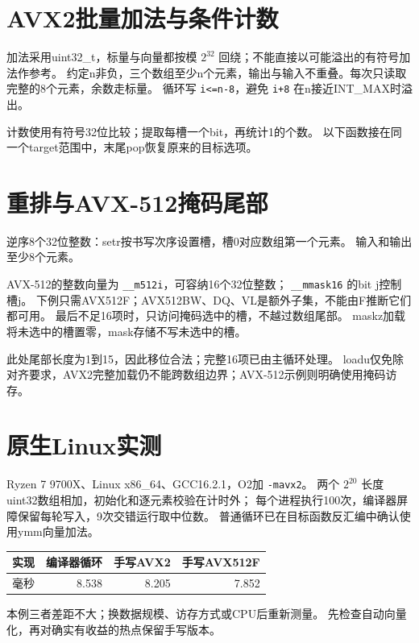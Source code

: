 \newpage
\section{AVX2批量加法与条件计数}
加法采用uint32\_t，标量与向量都按模 $2^{32}$ 回绕；不能直接以可能溢出的有符号加法作参考。
约定n非负，三个数组至少n个元素，输出与输入不重叠。每次只读取完整的8个元素，余数走标量。
循环写 \texttt{i<=n-8}，避免 \texttt{i+8} 在n接近INT\_MAX时溢出。

计数使用有符号32位比较；提取每槽一个bit，再统计1的个数。
以下函数接在同一个target范围中，末尾pop恢复原来的目标选项。


\newpage
\section{重排与AVX-512掩码尾部}
逆序8个32位整数：setr按书写次序设置槽，槽0对应数组第一个元素。
输入和输出至少8个元素。


AVX-512的整数向量为 \texttt{\_\_m512i}，可容纳16个32位整数；
\texttt{\_\_mmask16} 的bit j控制槽j。
下例只需AVX512F；AVX512BW、DQ、VL是额外子集，不能由F推断它们都可用。
最后不足16项时，只访问掩码选中的槽，不越过数组尾部。
maskz加载将未选中的槽置零，mask存储不写未选中的槽。

此处尾部长度为1到15，因此移位合法；完整16项已由主循环处理。
loadu仅免除对齐要求，AVX2完整加载仍不能跨数组边界；AVX-512示例则明确使用掩码访存。

\section{原生Linux实测}
Ryzen 7 9700X、Linux x86\_64、GCC16.2.1，O2加 \texttt{-mavx2}。
两个 $2^{20}$ 长度uint32数组相加，初始化和逐元素校验在计时外；
每个进程执行100次，编译器屏障保留每轮写入，9次交错运行取中位数。
普通循环已在目标函数反汇编中确认使用ymm向量加法。
\begin{center}
\begin{tabular}{lrrr}\toprule
实现 & 编译器循环 & 手写AVX2 & 手写AVX512F\\\midrule
毫秒 & 8.538 & 8.205 & 7.852\\\bottomrule
\end{tabular}
\end{center}
本例三者差距不大；换数据规模、访存方式或CPU后重新测量。
先检查自动向量化，再对确实有收益的热点保留手写版本。
